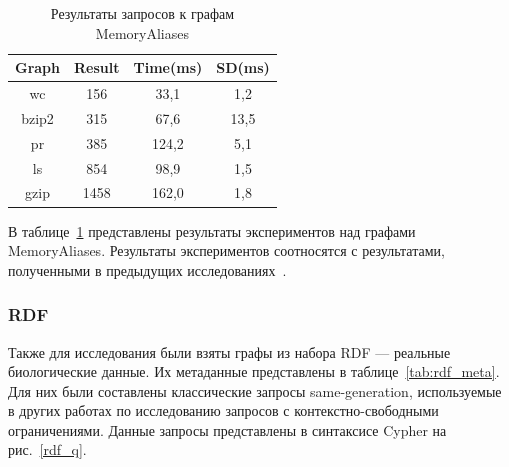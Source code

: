 \documentclass[14pt]{matmex-diploma-custom}
\begin{document}
\begin{table}[h!]
    \centering
    \begin{tabular}{|c||c|c|c|}
        \hline
        Graph & Result & Time(ms) & SD(ms) \\
        \hline \hline
        wc & 156 & 33,1 & 1,2 \\
        bzip2 & 315 & 67,6 & 13,5 \\
        pr & 385 & 124,2 & 5,1 \\
        ls & 854 & 98,9 & 1,5 \\
        gzip & 1458 & 162,0 & 1,8 \\
        \hline
    \end{tabular}
    \caption{Результаты запросов к графам MemoryAliases}
    \label{tab:memoryal_res}
\end{table}

В таблице~\ref{tab:memoryal_res} представлены результаты экспериментов над графами MemoryAliases. Результаты экспериментов соотносятся с результатами, полученными в предыдущих исследованиях~\cite{memoryaliases}.
\subsubsection{RDF}
Также для исследования были взяты графы из набора RDF --- реальные биологические данные. Их метаданные представлены в таблице~\ref{tab:rdf_meta}. Для них были составлены классические запросы same-generation, используемые в других работах по исследованию запросов с контекстно-свободными ограничениями. Данные запросы представлены в синтаксисе Cypher на рис.~\ref{rdf_q}.
\begin{table}[h!]
    \centering
    \caption{Метаданные графов с RDF-данными}
    \label{tab:rdf_meta}
\end{table}\\
\end{document}
